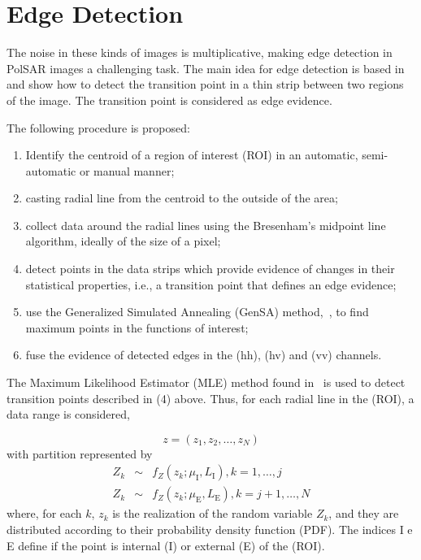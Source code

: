 \documentclass[journal]{IEEEtran}
\begin{document}
\section{Edge Detection}\label{sec_03}
The noise in these kinds of images is multiplicative, making edge detection in PolSAR images a challenging task. The main idea for edge detection is based in~\cite{nhfc, gmbf} and show how to detect the transition point in a thin strip between two regions of the image. The transition point is considered as edge evidence. 

The following procedure is proposed:
\begin{enumerate}
	\item Identify the centroid of a region of interest (ROI) in an automatic, semi-automatic or manual manner;
	\item casting radial line from the centroid to the outside of the area;
	\item collect data around the radial lines using the  Bresenham's midpoint line algorithm, ideally of the size of a pixel;
	\item detect points in the data strips which provide evidence of changes in their statistical properties, i.e., a transition point that defines an edge evidence;
	\item use the Generalized Simulated Annealing (GenSA) method,~\cite{xgsh}, to find maximum points in the functions of interest;
	\item fuse the evidence of detected edges in the (hh), (hv) and (vv) channels.
\end{enumerate}

The Maximum Likelihood Estimator (MLE) method found in~\cite{gmbf, nhfc} is used to detect transition points described in (4) above. Thus, for each radial line in the (ROI), a data range is considered,

\begin{equation}\nonumber
	z = (z_1,z_2,\dots,z_N)
\end{equation}
with partition represented by
\begin{equation}\label{func_max_ver_uni_gamma} 
\begin{array}{lll}
	Z_k&\sim& f_Z(z_k;\mu_\text{I},L_\text{I}), k=1,\dots,j\\
	Z_k&\sim& f_Z(z_k;\mu_\text{E},L_\text{E}), k=j+1,\dots,N
\end{array}
\end{equation}
where, for each $k$, $z_k$ is the realization of the random variable $Z_k$, and they are distributed according to their probability density function (PDF). The indices I e E define if the point is internal (I) or external (E) of the (ROI).
\end{document}
